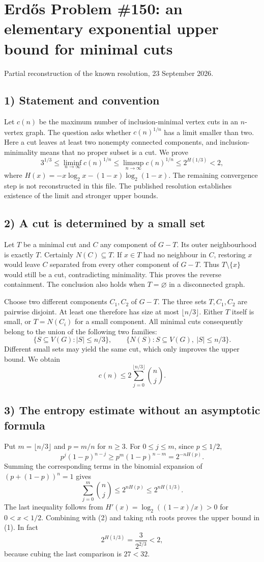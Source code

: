 \section{Erd\H{o}s Problem \#150: an elementary exponential upper bound for minimal cuts}
\noindent Partial reconstruction of the known resolution, 23 September 2026.

\subsection*{1) Statement and convention}
Let $c(n)$ be the maximum number of inclusion-minimal vertex cuts in an $n$-vertex graph. The question asks whether $c(n)^{1/n}$ has a limit smaller than two. Here a cut leaves at least two nonempty connected components, and inclusion-minimality means that no proper subset is a cut. We prove
\[
 3^{1/3}\le\liminf_{n\to\infty}c(n)^{1/n}
 \le\limsup_{n\to\infty}c(n)^{1/n}
 \le2^{H(1/3)}<2,\tag{1}
\]
where $H(x)=-x\log_2x-(1-x)\log_2(1-x)$. The remaining convergence step is not reconstructed in this file. The published resolution establishes existence of the limit and stronger upper bounds.

\subsection*{2) A cut is determined by a small set}
Let $T$ be a minimal cut and $C$ any component of $G-T$. Its outer neighbourhood is exactly $T$. Certainly $N(C)\subseteq T$. If $x\in T$ had no neighbour in $C$, restoring $x$ would leave $C$ separated from every other component of $G-T$. Thus $T\setminus\{x\}$ would still be a cut, contradicting minimality. This proves the reverse containment. The conclusion also holds when $T=\varnothing$ in a disconnected graph.

Choose two different components $C_1,C_2$ of $G-T$. The three sets $T,C_1,C_2$ are pairwise disjoint. At least one therefore has size at most $\lfloor n/3\rfloor$. Either $T$ itself is small, or $T=N(C_i)$ for a small component. All minimal cuts consequently belong to the union of the following two families:
\[
 \{S\subseteq V(G):|S|\le n/3\},\qquad
 \{N(S):S\subseteq V(G),\ |S|\le n/3\}.
\]
Different small sets may yield the same cut, which only improves the upper bound. We obtain
\[
 c(n)\le2\sum_{j=0}^{\lfloor n/3\rfloor}\binom nj.\tag{2}
\]

\subsection*{3) The entropy estimate without an asymptotic formula}
Put $m=\lfloor n/3\rfloor$ and $p=m/n$ for $n\ge3$. For $0\le j\le m$, since $p\le1/2$,
\[
 p^j(1-p)^{n-j}\ge p^m(1-p)^{n-m}=2^{-nH(p)}.
\]
Summing the corresponding terms in the binomial expansion of $(p+(1-p))^n=1$ gives
\[
 \sum_{j=0}^m\binom nj\le2^{nH(p)}\le2^{nH(1/3)}.
\]
The last inequality follows from $H'(x)=\log_2((1-x)/x)>0$ for $0<x<1/2$. Combining with (2) and taking $n$th roots proves the upper bound in (1). In fact
\[
 2^{H(1/3)}=\frac{3}{2^{2/3}}<2,
\]
because cubing the last comparison is $27<32$.

